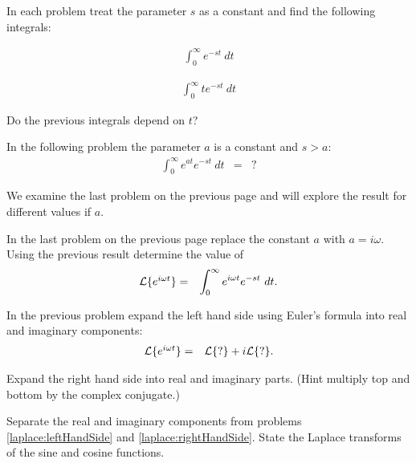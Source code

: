 \begin{problem}
\item In each problem treat the parameter $s$ as a constant and find
  the following integrals:
  \begin{subproblem}
  \item 
    \begin{eqnarray}
      \int^\infty_0 e^{-st} ~ dt
    \end{eqnarray}
    \vfill

  \item 
    \begin{eqnarray}
      \int^\infty_0 te^{-st} ~ dt
    \end{eqnarray}
    \vfill

  \item Do the previous integrals depend on $t$?

  \item In the following problem the parameter $a$ is a constant and
    $s>a$:
    \begin{eqnarray}
      \int^\infty_0 e^{at} e^{-st} ~ dt & = & ?
    \end{eqnarray}
    \vfill

  \end{subproblem}
  

  \clearpage

\item We examine the last problem on the previous page and will
  explore the result for different values if $a$.

  \begin{subproblem}
  \item In the last problem on the previous page replace the
    constant $a$ with $a=i\omega$. Using the previous result
    determine the value of
    \begin{eqnarray}
      \laplace{e^{i\omega t}} & = & \int^\infty_0 e^{i\omega t} e^{-st} ~ dt.
    \end{eqnarray}
    \vfill

  \item \label{laplace:leftHandSide} In the previous problem expand
    the left hand side using Euler's formula into real and imaginary
    components:
    \begin{eqnarray}
      \laplace{e^{i\omega t}} & = & \laplace{?} + i \laplace{?}.
    \end{eqnarray}
    \vfill

  \item \label{laplace:rightHandSide} Expand the right hand side
    into real and imaginary parts. (Hint multiply top and bottom by
    the complex conjugate.)

    \vfill

  \item Separate the real and imaginary components from problems
    \ref{laplace:leftHandSide} and
    \ref{laplace:rightHandSide}. State the Laplace transforms of the
    sine and cosine functions.  \vfill


  \end{subproblem}


\end{problem}


